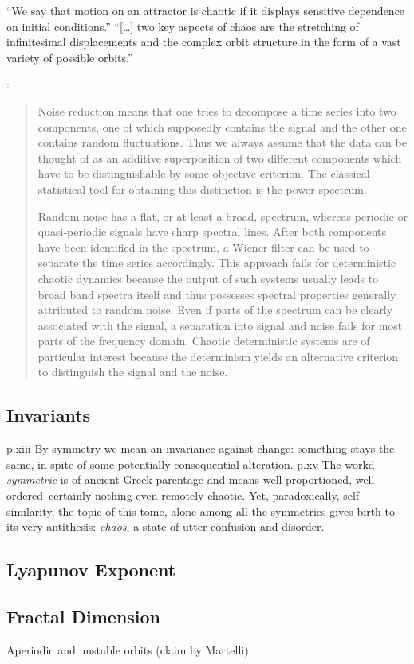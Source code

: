 \documentclass[11pt]{book}
\begin{document}
``We say that motion on an attractor is chaotic if it displays sensitive dependence on initial conditions.'' \citep[p~11]{ott1994}
``[\ldots] two key aspects of chaos are the stretching of infinitesimal displacements and the complex orbit structure in the form of a vast variety of possible orbits.'' \citep[p~31]{ott2002}

\citet[p~51]{kantz-schreiber}:
\begin{quotation}
Noise reduction means that one tries to decompose a time series into two components, one of which supposedly contains the signal and the other one contains random fluctuations.
Thus we always assume that the data can be thought of as an additive superposition of two different components which have to be distinguishable by some objective criterion.
The classical statistical tool for obtaining this distinction is the power spectrum.

Random noise has a flat, or at least a broad, spectrum, whereas periodic or quasi-periodic signals have sharp spectral lines.
After both components have been identified in the spectrum, a Wiener filter can be used to separate the time series accordingly.
This approach fails for deterministic chaotic dynamics because the output of such systems usually leads to broad band spectra itself and thus possesses spectral properties generally attributed to random noise.
Even if parts of the spectrum can be clearly associated with the signal, a separation into signal and noise fails for most parts of the frequency domain. Chaotic deterministic systems are of particular interest because the determinism yields an alternative criterion to distinguish the signal and the noise. 
\end{quotation}

\subsection{Invariants}
p.xiii
  By symmetry we mean an invariance against change: something stays the same, in spite of some potentially consequential alteration.
p.xv
  The workd \textit{symmetric} is of ancient Greek parentage and means well-proportioned, well-ordered--certainly nothing even remotely chaotic.
  Yet, paradoxically, self-similarity, the topic of this tome, alone among all the symmetries gives birth to its very antithesis: \textit{chaos},
  a state of utter confusion and disorder.

\subsection{Lyapunov Exponent}

\subsection{Fractal Dimension}

Aperiodic and unstable orbits (claim by Martelli)



\end{document}
